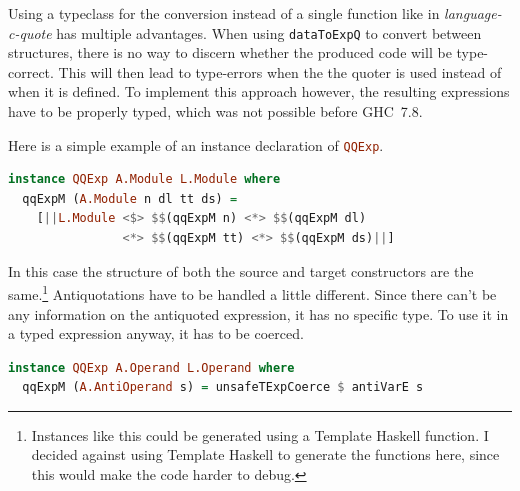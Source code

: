 \documentclass[a4paper,bibliography=totocnumbered,parskip,headsepline]{scrbook}
\begin{document}
Using a typeclass for the conversion instead of a single function like in \emph{language-c-quote} has multiple advantages.
When using \lstinline[language=haskell]!dataToExpQ! to convert between structures, there is no way to discern whether the produced code will be type-correct.
This will then lead to type-errors when the the quoter is used instead of when it is defined.
To implement this approach however, the resulting expressions have to be properly typed, which was not possible before GHC~7.8.

Here is a simple example of an instance declaration of \lstinline[language=haskell]!QQExp!.
\begin{lstlisting}[language=haskell]
instance QQExp A.Module L.Module where
  qqExpM (A.Module n dl tt ds) =
    [||L.Module <$> $$(qqExpM n) <*> $$(qqExpM dl)
                <*> $$(qqExpM tt) <*> $$(qqExpM ds)||]
\end{lstlisting}
In this case the structure of both the source and target constructors are the same.\footnote{Instances like this could be generated using a Template Haskell function.
I decided against using Template Haskell to generate the functions here, since this would make the code harder to debug.}
Antiquotations have to be handled a little different.
Since there can't be any information on the antiquoted expression, it has no specific type.
To use it in a typed expression anyway, it has to be coerced.

\begin{minipage}{\textwidth}
\begin{lstlisting}[language=haskell]
instance QQExp A.Operand L.Operand where
  qqExpM (A.AntiOperand s) = unsafeTExpCoerce $ antiVarE s
\end{lstlisting}
\end{minipage}
\end{document}

